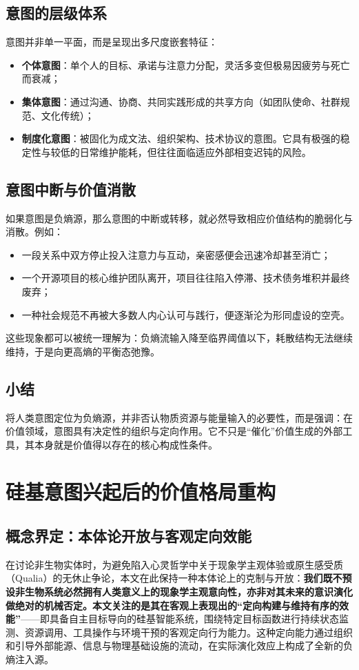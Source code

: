 \documentclass[11pt,a4paper]{ctexart}
\begin{document}
\subsection{意图的层级体系}
意图并非单一平面，而是呈现出多尺度嵌套特征：
\begin{itemize}
    \item \textbf{个体意图}：单个人的目标、承诺与注意力分配，灵活多变但极易因疲劳与死亡而衰减；
    \item \textbf{集体意图}：通过沟通、协商、共同实践形成的共享方向（如团队使命、社群规范、文化传统）；
    \item \textbf{制度化意图}：被固化为成文法、组织架构、技术协议的意图。它具有极强的稳定性与较低的日常维护能耗，但往往面临适应外部相变迟钝的风险。
\end{itemize}

\subsection{意图中断与价值消散}
如果意图是负熵源，那么意图的中断或转移，就必然导致相应价值结构的脆弱化与消散。例如：
\begin{itemize}
    \item 一段关系中双方停止投入注意力与互动，亲密感便会迅速冷却甚至消亡；
    \item 一个开源项目的核心维护团队离开，项目往往陷入停滞、技术债务堆积并最终废弃；
    \item 一种社会规范不再被大多数人内心认可与践行，便逐渐沦为形同虚设的空壳。
\end{itemize}

这些现象都可以被统一理解为：负熵流输入降至临界阈值以下，耗散结构无法继续维持，于是向更高熵的平衡态弛豫。

\subsection{小结}
将人类意图定位为负熵源，并非否认物质资源与能量输入的必要性，而是强调：在价值领域，意图具有决定性的组织与定向作用。它不只是“催化”价值生成的外部工具，其本身就是价值得以存在的核心构成性条件。

\section{硅基意图兴起后的价值格局重构}

\subsection{概念界定：本体论开放与客观定向效能}
在讨论非生物实体时，为避免陷入心灵哲学中关于现象学主观体验或原生感受质（Qualia）的无休止争论，本文在此保持一种本体论上的克制与开放：\textbf{我们既不预设非生物系统必然拥有人类意义上的现象学主观意向性，亦非对其未来的意识演化做绝对的机械否定。本文关注的是其在客观上表现出的“定向构建与维持有序的效能”}——即具备自主目标导向的硅基智能系统，围绕特定目标函数进行持续状态监测、资源调用、工具操作与环境干预的客观定向行为能力。这种定向能力通过组织和引导外部能源、信息与物理基础设施的流动，在实际演化效应上构成了全新的负熵注入源。
\end{document}
